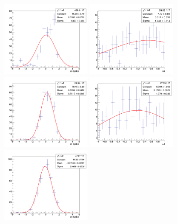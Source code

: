 \begin{figure}[!htb]
	\centering
	\includegraphics[width=0.4\textwidth]{Figures/signalInjection0_500_sigpull_3000wide.png}
	\includegraphics[width=0.4\textwidth]{Figures/signalInjection0_500_sigstrength_3000wide.png}
	\includegraphics[width=0.4\textwidth]{Figures/signalInjection1_500_sigpull_3000wide.png}
	\includegraphics[width=0.4\textwidth]{Figures/signalInjection1_500_sigstrength_3000wide.png}
	\includegraphics[width=0.4\textwidth]{Figures/signalInjection3_500_sigpull_3000wide.png}

\end{figure}
